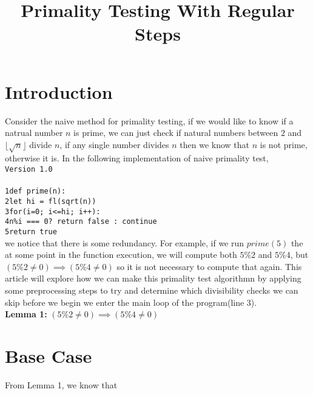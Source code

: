 \documentclass[12pt]{article}
\def\code#1{\texttt{#1}}
\def\ph#1{\phantom{#1}}
\begin{document}
\title{Primality Testing With Regular Steps}
\maketitle

\section{Introduction}
Consider the naive method for primality testing, if we would like to know if a natrual number $n$ is prime,
we can just check if natural numbers between $2$ and $\lfloor\sqrt{n}\rfloor$ divide $n$, if any single number
divides $n$ then we know that $n$ is not prime, otherwise it is. In the following implementation of naive
primality test,\\

\noindent
\code{Version 1.0}\\\\
\code{1\indent def prime(n):}\\
\code{2\indent\ph{..}let hi = fl(sqrt(n))}\\
\code{3\indent\ph{..}for(i=0; i<=hi; i++):}\\
\code{4\indent\ph{....}n\%i === 0? return false : continue}\\
\code{5\indent\ph{..}return true}\\

\noindent
we notice that there is some redundancy. For example, if we run $prime(5)$ the at some point in the function
execution, we will compute both $5\%2$ and $5\%4$, but $(5\%2\neq 0) \implies (5\%4\neq 0)$ so it is not necessary to
compute that again. This article will explore how we can make this primality test algorithmn by applying some
preprocessing steps to try and determine which divisibility checks we can skip before we begin we enter the
main loop of the program(line 3).\\

\noindent
\textbf{Lemma 1:} $(5\%2\neq 0) \implies (5\%4\neq 0)$

\section{Base Case}
From Lemma 1, we know that
\end{document}
